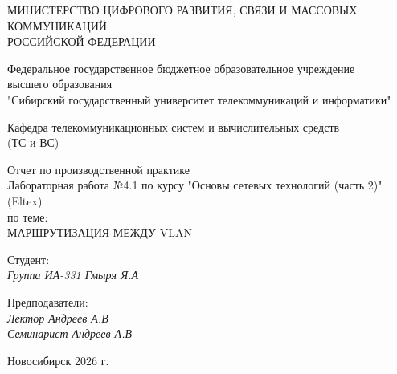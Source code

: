\thispagestyle{empty}

\begin{center}
    МИНИСТЕРСТВО ЦИФРОВОГО РАЗВИТИЯ, СВЯЗИ И МАССОВЫХ КОММУНИКАЦИЙ \\ РОССИЙСКОЙ ФЕДЕРАЦИИ

    \vspace{20pt}

    Федеральное государственное бюджетное образовательное учреждение  \\  высшего образования \\
    "Сибирский государственный университет телекоммуникаций и информатики" \\

    \vspace{20pt}

    Кафедра телекоммуникационных систем и вычислительных средств \\  (ТС и ВС)
\end{center}

\vfill

\begin{center}
    Отчет по производственной практике \\  
    Лабораторная работа №4.1 по курсу "Основы сетевых технологий (часть 2)" (Eltex) \\
    \vspace{20pt}
    по теме: \\
    \uppercase{Маршрутизация между VLAN}
\end{center}

\vfill

    \noindent Студент: \\
    \textit{Группа ИА-331 \hfill Гмыря Я.А} 

    \vspace{20pt}
 
    \noindent Предподаватели: \\
    \textit{Лектор \hfill Андреев А.В} \\
    \textit{Семинарист \hfill Андреев А.В}

\vfill

\begin{center}
    Новосибирск 2026 г.
\end{center}